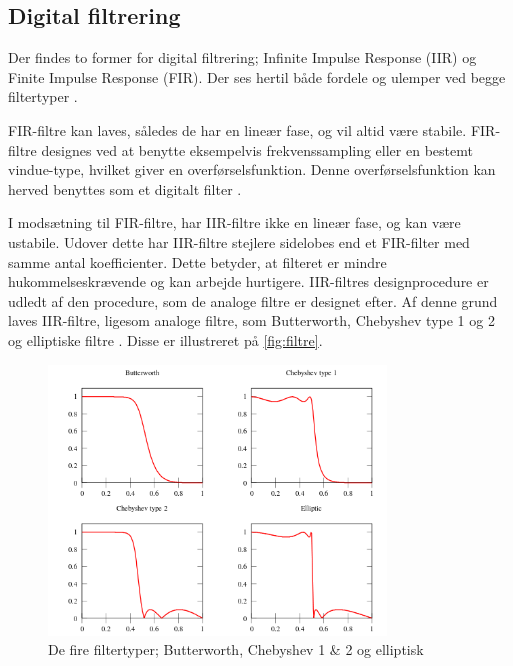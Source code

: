 \subsection{Digital filtrering}
Der findes to former for digital filtrering; Infinite Impulse Response (IIR) og Finite Impulse Response (FIR). Der ses hertil både fordele og ulemper ved begge filtertyper \citep{blandford2012}.

FIR-filtre kan laves, således de har en lineær fase, og vil altid være stabile. FIR-filtre designes ved at benytte eksempelvis frekvenssampling eller en bestemt vindue-type, hvilket giver en overførselsfunktion. Denne overførselsfunktion kan herved benyttes som et digitalt filter \citep{blandford2012}. 

I modsætning til FIR-filtre, har IIR-filtre ikke en lineær fase, og kan være ustabile. Udover dette har IIR-filtre stejlere sidelobes end et FIR-filter med samme antal koefficienter. Dette betyder, at filteret er mindre hukommelseskrævende og kan arbejde hurtigere. IIR-filtres designprocedure er udledt af den procedure, som de analoge filtre er designet efter. Af denne grund laves IIR-filtre, ligesom analoge filtre, som Butterworth, Chebyshev type 1 og 2 og elliptiske filtre \citep{blandford2012}. Disse er illustreret på \autoref{fig:filtre}. 
\\

\begin{figure}[H]
\centering
\includegraphics[width=0.8\textwidth]{figures/filtre}
\caption{De fire filtertyper; Butterworth, Chebyshev 1 \& 2 og elliptisk \citep{wikipedia2016}}
\label{fig:filtre}
\end{figure}


